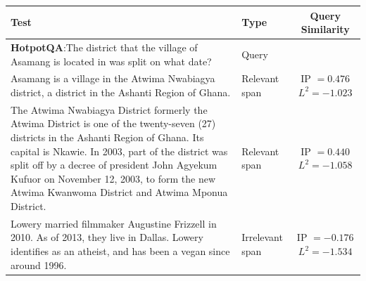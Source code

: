 \begin{table}
    \center
    \renewcommand{\arraystretch}{1.5} %
    \begin{tabular}{p{7.5cm}lc}
        \toprule
        \textbf{Test}                                                                                             & \textbf{Type}               & \textbf{Query Similarity} \\
        \midrule
        \textbf{HotpotQA}:\newline The district that the village of Asamang is located in was split on what date? & Query                                                   \\
        \cmidrule{2-3}
        Asamang is a village in the Atwima Nwabiagya district, a district in the Ashanti Region of Ghana.
                                                                                                                  & Relevant span
                                                                                                                  & \makecell[tl]{IP $= 0.476$                              \\ $L^2 = -1.023$} \\
        The Atwima Nwabiagya District formerly the Atwima District is one of the twenty-seven (27) districts in the Ashanti Region of Ghana. Its capital is Nkawie. In 2003, part of the district was split off by a decree of president John Agyekum Kufuor on November 12, 2003, to form the new Atwima Kwanwoma District and Atwima Mponua District.
                                                                                                                  & Relevant span
                                                                                                                  & \makecell[tl]{IP $= 0.440$                              \\ $L^2 = -1.058$} \\
        Lowery married filmmaker Augustine Frizzell in 2010. As of 2013, they live in Dallas. Lowery identifies as an atheist, and has been a vegan since around 1996.
                                                                                                                  & Irrelevant span
                                                                                                                  & \makecell[tl]{IP $= -0.176$                             \\ $L^2 = -1.534$} \\

\end{tabular}
\end{table}
